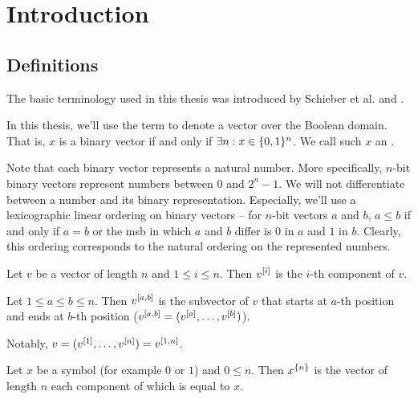 \chapter{Introduction}

\section{Definitions}

The basic terminology used in this thesis
was introduced by Schieber et al. \cite{Schieber2005154}
and \dubovsky{} \cite{Dubovsky2012}.

\begin{definition}
In this thesis,
we'll use the term 
to denote a vector over the Boolean domain.
That is, $x$ is a binary vector if and only if
$\exists n : x \in \{0, 1\}^n$.
We call such $x$ an .
\end{definition}

Note that each binary vector represents a natural number.
More specifically,
$n$-bit binary vectors represent numbers
between $0$ and $2^n - 1$.
We will not differentiate between a number
and its binary representation.
Especially,
we'll use a lexicographic linear ordering
on binary vectors --
for $n$-bit vectors $a$ and $b$,
$a \leq b$ if and only if $a = b$ or
the \acrlong{msb}
in which $a$ and $b$ differ
is $0$ in $a$ and $1$ in $b$.
Clearly,
this ordering corresponds to the natural ordering
on the represented numbers.

\begin{definition}
Let $v$ be a vector of length $n$ and $1 \leq i \leq n$.
Then $v^{[i]}$ is the $i$-th component of $v$.

Let $1 \leq a \leq b \leq n$.
Then $v^{[a, b]}$ is the subvector of $v$
that starts at $a$-th position
and ends at $b$-th position
($v^{[a, b]} = (v^{[a]}, \ldots, v^{[b]})$).
\end{definition}

Notably,
$v = (v^{[1]}, \ldots, v^{[n]}) = v^{[1, n]}$.

\begin{definition}
Let $x$ be a symbol (for example $0$ or $1$)
and $0 \leq n$.
Then $x^{\{n\}}$ is the vector of length $n$
each component of which is equal to $x$.
\end{definition}

